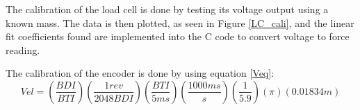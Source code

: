 The calibration of the load cell is done by testing its voltage output using a known mass. The data is then plotted, as seen in Figure \ref{LC_cali}, and the linear fit coefficients found are implemented into the C code to convert voltage to force reading.\par
The calibration of the encoder is done by using equation \ref{Veq}:
\begin{equation}
\label{Veq}
    Vel=(\frac{BDI}{BTI})(\frac{1 rev}{2048 BDI})(\frac{BTI}{5 ms})(\frac{1000 ms}{s})(\frac{1}{5.9})(\pi)(0.01834 m)
\end{equation}